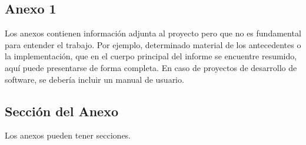 \begin{appendix}

\chapter{Anexo 1}

Los anexos contienen información adjunta al proyecto pero que no es fundamental
para entender el trabajo. Por ejemplo, determinado material de los antecedentes o la
implementación, que en el cuerpo principal del informe se encuentre resumido, aquí
puede presentarse de forma completa. En caso de proyectos de desarrollo de
software, se debería incluir un manual de usuario.

\section{Sección del Anexo}

Los anexos pueden tener secciones.

\end{appendix}